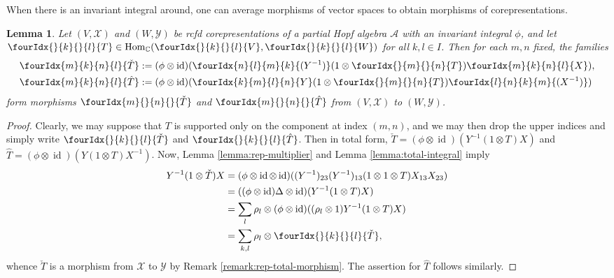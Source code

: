 \documentclass[11pt]{article}
\DeclareMathOperator{\id}{id}
\DeclareMathOperator{\Hom}{Hom}
\newcommand{\C}{\mathbb{C}}
\newcommand{\Gr}[5]{\fourIdx{#2}{#4}{#3}{#5}{#1}}%
\newcommand{\Gru}[3]{\Gr{#1}{}{}{#2}{#3}}
\newcommand{\Grd}[3]{\Gr{#1}{#2}{#3}{}{}}
\newtheorem{Lem}[Theorem]{Lemma}
\theoremstyle{definition}
\numberwithin{equation}{section}
\begin{document}
When there is an invariant integral around, one can average morphisms of vector spaces to obtain morphisms of corepresentations. 
\begin{Lem} \label{lem:rep-average}  Let $(V,\mathscr{X})$ and
  $(W,\mathscr{Y})$ be rcfd corepresentations of  a partial
  Hopf algebra $\mathscr{A}$ with an invariant integral $\phi$, and let
  $\Gru{T}{k}{l} \in \Hom_{\C}(\Gru{V}{k}{l},\Gru{W}{k}{l})$ for all $k,l\in I$. Then for each $m,n$ fixed, the families
  \begin{align*}
    \Gr{\check T}{m}{n}{k}{l} &:= (\phi \otimes
    \id)(\Gr{(Y^{-1})}{n}{m}{l}{k}(1\otimes
    \Gru{T}{m}{n})\Gr{X}{m}{n}{k}{l}), \\
    \Gr{\hat T}{m}{n}{k}{l} &:=(\phi \otimes
    \id)(\Gr{Y}{k}{l}{m}{n}(1\otimes
    \Gru{T}{m}{n})\Gr{(X^{-1})}{l}{k}{n}{m})
  \end{align*} %
form  morphisms $\Grd{\check{T}}{m}{n}$ and $\Grd{\hat{T}}{m}{n}$ from $(V,\mathscr{X})$ to $(W,\mathscr{Y})$. 
\end{Lem} 
\begin{proof} Clearly, we may suppose that $T$ is supported only on the component at index $(m,n)$, and we may then drop the upper indices and simply write $\Gru{\check{T}}{k}{l}$ and $\Gru{\hat{T}}{k}{l}$. Then 
 in total form, $\check{T}=(\phi \otimes \id)(Y^{-1}(1 \otimes T)X)$
  and $\hat{T}=(\phi \otimes \id)(Y(1 \otimes T)X^{-1})$.  Now, Lemma
  \ref{lemma:rep-multiplier} and Lemma \ref{lemma:total-integral} 
  imply
  \begin{align*}
    Y^{-1}(1 \otimes \check{T})X &= (\phi \otimes \id \otimes
    \id)((Y^{-1})_{23}(Y^{-1})_{13}(1 \otimes 1
    \otimes T)X_{13}X_{23})  \\
    &= ((\phi \otimes\id)  \Delta  \otimes \id)(Y^{-1}(1 \otimes T)X) \\
    &= \sum_{l} \rho_{l} \otimes (\phi \otimes \id)((\rho_{l} \otimes
    1)Y^{-1}(1 \otimes T)X)  \\
    &= \sum_{k,l} \rho_{l} \otimes \Gru{\check T}{k}{l},
  \end{align*}
  whence $\check{T}$ is a morphism from $\mathscr{X}$ to $\mathscr{Y}$
  by Remark \ref{remark:rep-total-morphism}. The assertion for $\hat
  T$ follows similarly.
\end{proof}
\end{document}
